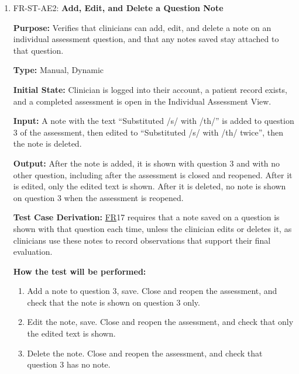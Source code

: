 \documentclass[12pt, titlepage]{article}
\newcommand{\srsfr}[1]{\href{https://github.com/Nour-Fawaz/MacaBoca/blob/main/pdfs/SRS/SRS.pdf}{FR}}
\renewcommand{\_}{\oldunderscore\allowbreak}
\begin{document}
\begin{enumerate}
  \item FR-ST-AE2: \textbf{Add, Edit, and Delete a Question Note\\}
  \begin{mdframed}[linewidth=0.5mm]
      \textbf{Purpose:} Verifies that clinicians can add, edit, and delete a note on an individual assessment question, and that any notes saved stay attached to that question. \par
      \textbf{Type:} Manual, Dynamic \par
      \textbf{Initial State:} Clinician is logged into their account, a patient record exists, and a completed assessment is open in the Individual Assessment View. \par
      \textbf{Input:} A note with the text ``Substituted /s/ with /th/'' is added to question 3 of the assessment, then edited to ``Substituted /s/ with /th/ twice'', then the note is deleted. \par
      \textbf{Output:} After the note is added, it is shown with question 3 and with no other question, including after the assessment is closed and reopened. After it is edited, only the edited text is shown. After it is deleted, no note is shown on question 3 when the assessment is reopened. \par
      \textbf{Test Case Derivation:} \srsfr*{17} requires that a note saved on a question is shown with that question each time, unless the clinician edits or deletes it, as clinicians use these notes to record observations that support their final evaluation. \par
      \textbf{How the test will be performed:}
      \begin{enumerate}
        \item[1.] Add a note to question 3, save. Close and reopen the assessment, and check that the note is shown on question 3 only.
        \item[2.] Edit the note, save. Close and reopen the assessment, and check that only the edited text is shown.
        \item[3.] Delete the note. Close and reopen the assessment, and check that question 3 has no note.
      \end{enumerate}
  \end{mdframed}


\end{enumerate}
\end{document}
